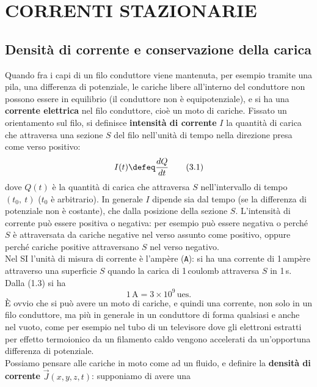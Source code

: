 \section{CORRENTI STAZIONARIE}

\subsection{Densit\`a di corrente e conservazione della carica}

Quando fra i capi di un filo conduttore viene mantenuta, per esempio tramite una
pila, una differenza di potenziale, le cariche libere all'interno del conduttore
non possono essere in equilibrio (il conduttore non \`e equipotenziale), e si ha
una \textbf{corrente elettrica} nel filo conduttore, cio\`e un moto di cariche.
Fissato un orientamento sul filo, si definisce \textbf{intensit\`a di corrente}
$I$ la quantit\`a di carica che attraversa una sezione $S$ del filo nell'unit\`a
di tempo nella direzione presa come verso positivo:
\begin{equation}
  I(t)\defeq\frac{dQ}{dt}
  \tag{3.1}
\end{equation}
dove $Q(t)$ \`e la quantit\`a di carica che attraversa $S$ nell'intervallo di
tempo $(t_0,\ t)$ ($t_0$ \`e arbitrario). In generale $I$ dipende sia dal tempo
(se la differenza di potenziale non \`e costante), che dalla posizione della
sezione $S$. L'intensit\`a di corrente pu\`o essere positiva o negativa: per
esempio pu\`o essere negativa o perch\'e $S$ \`e attraversata da cariche
negative nel verso assunto come positivo, oppure perch\'e cariche positive
attraversano $S$ nel verso negativo.\\
Nel SI l'unit\`a di misura di corrente \`e l'amp\`ere (\texttt{A}): si ha una
corrente di 1\,amp\`ere attraverso una superficie $S$ quando la carica di
1\,coulomb attraversa $S$ in 1\,s. Dalla (1.3) si ha
\begin{equation}
  1\,\mathrm A=3\times10^9\,\mathrm{ues}.
  \tag{3.2}
\end{equation}
\`E ovvio che si pu\`o avere un moto di cariche, e quindi una corrente, non solo
in un filo conduttore, ma pi\`u in generale in un conduttore di forma qualsiasi
e anche nel vuoto, come per esempio nel tubo di un televisore dove gli elettroni
estratti per effetto termoionico da un filamento caldo vengono accelerati da
un'opportuna differenza di potenziale.\\
Possiamo pensare alle cariche in moto come ad un fluido, e definire la
\textbf{densit\`a di corrente} $\vec J(x,y,z,t)$: supponiamo di avere una

